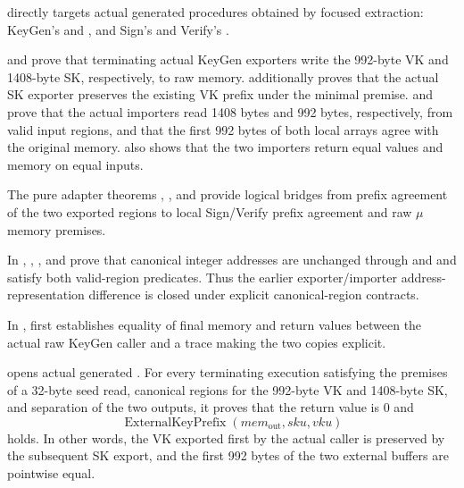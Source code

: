  directly
targets actual generated procedures obtained by focused extraction: KeyGen's
 and
, and Sign's and Verify's
.

\begin{verified}
\label{thm:api-copy-prefix}
 and
 prove that terminating actual KeyGen
exporters write the 992-byte VK and 1408-byte SK, respectively, to raw memory.
 additionally proves that
the actual SK exporter preserves the existing VK prefix under the minimal
 premise.
 and
 prove that the actual importers read
1408 bytes and 992 bytes, respectively, from valid input regions, and that the
first 992 bytes of both local arrays agree with the original memory.
 also shows that the two
importers return equal values and memory on equal inputs.
\end{verified}

The pure adapter theorems ,
, and
 provide logical bridges from
prefix agreement of the two exported regions to local Sign/Verify prefix
agreement and raw \(\mu\) memory premises.

In ,
,
, and 
prove that canonical integer addresses are unchanged through
 and  and satisfy both
valid-region predicates. Thus the earlier exporter/importer address-representation
difference is closed under explicit canonical-region contracts.

In ,
 first establishes equality of
final memory and return values between the actual raw KeyGen caller and a trace
making the two copies explicit.

\begin{verified}
\label{thm:raw-keygen-export}
 opens actual generated
. For every terminating
execution satisfying the premises of a 32-byte seed read, canonical regions for
the 992-byte VK and 1408-byte SK, and separation of the two outputs, it proves
that the return value is 0 and
\[
  \operatorname{ExternalKeyPrefix}(mem_{\mathrm{out}},sku,vku)
\]
holds. In other words, the VK exported first by the actual caller is preserved
by the subsequent SK export, and the first 992 bytes of the two external buffers
are pointwise equal.
\end{verified}

